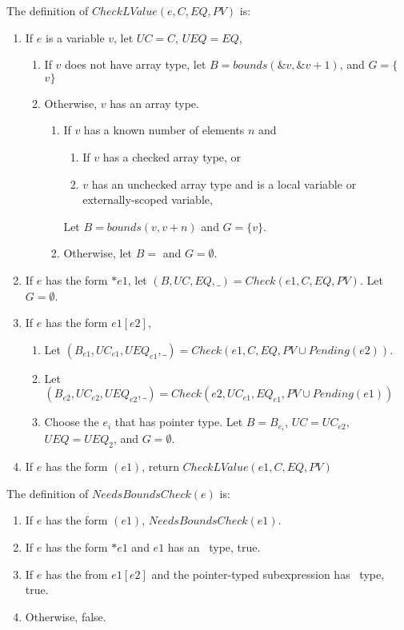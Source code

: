 The definition of $CheckLValue(e, C, EQ, PV)$ is:
\begin{enumerate}
\item If $e$ is a variable $v$, let $UC = C$, $UEQ=EQ$,
\begin{enumerate}
\item If $v$ does not have array type, let $B = bounds(\&v,\&v + 1)$,  and 
$G=\{$ \code{&}$v \}$
\item Otherwise, $v$ has an array type.
\begin{enumerate}
\item If $v$ has a known number of elements $n$ and
\begin{enumerate}
\item If $v$ has a checked array type, or
\item $v$ has an unchecked array type and is a local variable or externally-scoped variable,
\end{enumerate}
Let $B = bounds(v, v + n)$ and $G =\{ v \}$.
\item Otherwise, let $B = $ \boundsunknown and $G = \emptyset$.
\end{enumerate}
\end{enumerate}
\item If $e$ has the form $*e1$,  let $(B, UC, EQ, \_) = Check(e1, C, EQ, PV)$.  Let $G =\emptyset$.
\item If $e$ has the form $e1[e2]$,
\begin{enumerate}
\item Let $(B_{e1}, {UC}_{e1}, {UEQ}_{e1}, \_) = Check(e1, C, EQ, PV \cup Pending(e2))$.
\item Let $(B_{e2}, {UC}_{e2}, {UEQ}_{e2}, \_) = Check(e2, {UC}_{e1}, {EQ}_{e1},
         PV \cup Pending(e1))$
\item Choose the $e_i$ that has pointer type.   Let $B = B_{e_i}$, $UC = {UC}_{e2}$, 
$UEQ  = {UEQ}_2$, and $G=\emptyset$.
\end{enumerate}
\item If $e$ has the form $(e1)$, return $CheckLValue(e1, C, EQ, PV)$
\end{enumerate}

The definition of $NeedsBoundsCheck(e)$ is:
\begin{enumerate}
\item If $e$ has the form $(e1)$, $NeedsBoundsCheck(e1).$
\item If $e$ has the form $*e1$ and $e1$ has an \arrayptr\ type, true.
\item If $e$ has the from $e1[e2]$ and the pointer-typed subexpression has \arrayptr\ type, true.
\item Otherwise, false.
\end{enumerate}

